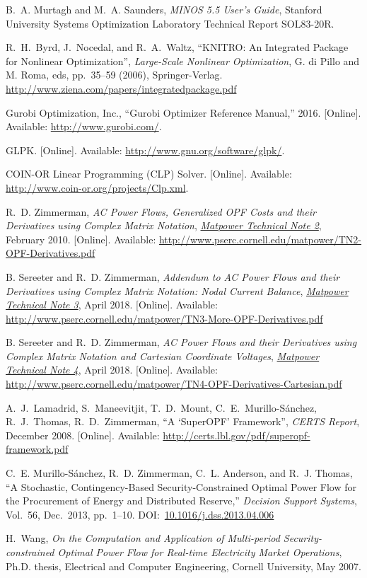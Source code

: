 \documentclass[12pt]{article}
\newcommand{\matpower}[0]{{\sc Matpower}}
\newcommand{\TNtwourl}[0]{http://www.pserc.cornell.edu/matpower/TN2-OPF-Derivatives.pdf}
\newcommand{\TNtwo}[0]{\href{\TNtwourl}{\it \matpower{} Technical Note 2}}
\newcommand{\TNthreeurl}[0]{http://www.pserc.cornell.edu/matpower/TN3-More-OPF-Derivatives.pdf}
\newcommand{\TNthree}[0]{\href{\TNthreeurl}{\it \matpower{} Technical Note 3}}
\newcommand{\TNfoururl}[0]{http://www.pserc.cornell.edu/matpower/TN4-OPF-Derivatives-Cartesian.pdf}
\newcommand{\TNfour}[0]{\href{\TNfoururl}{\it \matpower{} Technical Note 4}}
\numberwithin{equation}{section}
\numberwithin{table}{section}
\numberwithin{figure}{section}
\begin{document}
\begin{thebibliography}{99}
B.~A. Murtagh and M.~A. Saunders, \emph{MINOS 5.5 User's Guide}, Stanford
  University Systems Optimization Laboratory Technical Report SOL83-20R.

R.~H.~Byrd, J.~Nocedal, and R.~A.~Waltz, ``KNITRO: An Integrated Package for Nonlinear Optimization'', \emph{Large-Scale Nonlinear Optimization}, G. di Pillo and M. Roma, eds, pp.~35--59 (2006), Springer-Verlag.\\
\url{http://www.ziena.com/papers/integratedpackage.pdf}

Gurobi Optimization, Inc., ``Gurobi Optimizer Reference Manual,'' 2016. [Online]. Available:
  \url{http://www.gurobi.com/}.

GLPK. [Online]. Available:
  \url{http://www.gnu.org/software/glpk/}.

COIN-OR Linear Programming (CLP) Solver. [Online]. Available:
  \url{http://www.coin-or.org/projects/Clp.xml}.

R.~D. Zimmerman, \emph{AC Power Flows, Generalized OPF Costs and their Derivatives using Complex Matrix Notation}, \TNtwo, February 2010. [Online]. Available: \url{\TNtwourl}

B. Sereeter and R.~D. Zimmerman, \emph{Addendum to AC Power Flows and their Derivatives using Complex Matrix Notation: Nodal Current Balance}, \TNthree, April 2018. [Online]. Available: \url{\TNthreeurl}

B. Sereeter and R.~D. Zimmerman, \emph{AC Power Flows and their Derivatives using Complex Matrix Notation and Cartesian Coordinate Voltages}, \TNfour, April 2018. [Online]. Available: \url{\TNfoururl}

A.~J.~Lamadrid, S.~Maneevitjit, T.~D.~Mount, C.~E.~Murillo-S{\'a}nchez, R.~J.~Thomas, R.~D.~Zimmerman, ``A `SuperOPF' Framework'', \emph{CERTS Report}, December 2008. [Online]. Available: \url{http://certs.lbl.gov/pdf/superopf-framework.pdf}

C.~E. Murillo-S{\'a}nchez, R.~D. Zimmerman, C.~L. Anderson, and R.~J. Thomas, ``A Stochastic, Contingency-Based Security-Constrained Optimal Power Flow for the Procurement of Energy and Distributed Reserve,'' \emph{Decision Support Systems}, Vol.~56, Dec.~2013, pp.~1--10.
DOI:~\href{https://doi.org/10.1016/j.dss.2013.04.006}{10.1016/j.dss.2013.04.006}

H.~Wang, \emph{On the Computation and Application of Multi-period Security-constrained Optimal Power Flow for Real-time Electricity Market Operations}, Ph.D. thesis, Electrical and Computer Engineering, Cornell University, May 2007.


\end{thebibliography}
\end{document}
